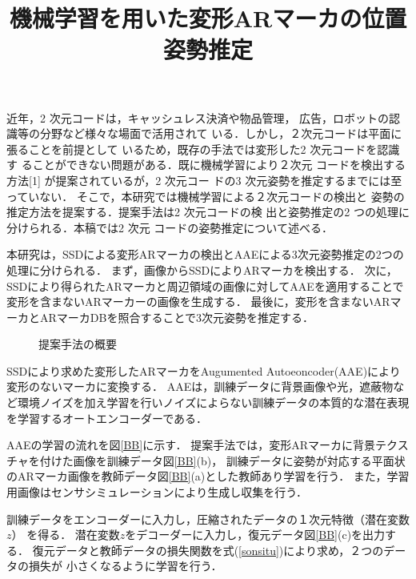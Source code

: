 \documentclass{jsarticle}
\title{機械学習を用いた変形ARマーカの位置姿勢推定}
\begin{document}
\maketitle

近年，2 次元コードは，キャッシュレス決済や物品管理，
広告，ロボットの認識等の分野など様々な場面で活用されて
いる．しかし，２次元コードは平面に張ることを前提として
いるため，既存の手法では変形した2 次元コードを認識す
ることができない問題がある．既に機械学習により２次元
コードを検出する方法[1] が提案されているが，2 次元コー
ドの3 次元姿勢を推定するまでには至っていない．
そこで，本研究では機械学習による２次元コードの検出と
姿勢の推定方法を提案する．提案手法は2 次元コードの検
出と姿勢推定の2 つの処理に分けられる．本稿では2 次元
コードの姿勢推定について述べる．


本研究は，SSDによる変形ARマーカの検出とAAEによる3次元姿勢推定の2つの処理に分けられる．
まず，画像からSSDによりARマーカを検出する．
次に，SSDにより得られたARマーカと周辺領域の画像に対してAAEを適用することで変形を含まないARマーカーの画像を生成する．
最後に，変形を含まないARマーカとARマーカDBを照合することで3次元姿勢を推定する．
\begin{figure}[ht]
\vspace{0zh}
\setlength{\epsfxsize}{7.5cm}
\centerline{}
\vspace{-1zh}
\caption{提案手法の概要}
\label{flow}
\vspace{-2zh}
\end{figure}

SSDにより求めた変形したARマーカをAugumented Autoeoncoder(AAE)により変形のないマーカに変換する．
AAEは，訓練データに背景画像や光，遮蔽物など環境ノイズを加え学習を行いノイズによらない訓練データの本質的な潜在表現を学習するオートエンコーダーである．

AAEの学習の流れを図\ref{BB}に示す．
提案手法では，変形ARマーカに背景テクスチャを付けた画像を訓練データ図\ref{BB}(b)，
訓練データに姿勢が対応する平面状のARマーカ画像を教師データ図\ref{BB}(a)とした教師あり学習を行う．
また，学習用画像はセンサシミュレーションにより生成し収集を行う．

訓練データをエンコーダーに入力し，圧縮されたデータの１次元特徴（潜在変数$z$）
を得る．
潜在変数$z$をデコーダーに入力し，復元データ図\ref{BB}(c)を出力する．
復元データと教師データの損失関数を式(\ref{sonsitu})により求め，２つのデータの損失が
小さくなるように学習を行う．
\end{document}
